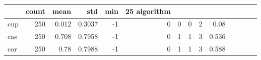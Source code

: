 \begin{tabular}{lrrrrrrrrr}
\toprule
 & count & mean & std & min & 25%
algorithm &  &  &  &  &  &  &  &  &  \\
\midrule
cup & 250 & 0.012 & 0.3037 & -1 & 0 & 0 & 0 & 2 & 0.08 \\
cas & 250 & 0.708 & 0.7958 & -1 & 0 & 1 & 1 & 3 & 0.536 \\
cor & 250 & 0.78 & 0.7988 & -1 & 0 & 1 & 1 & 3 & 0.588 \\
\bottomrule
\end{tabular}
